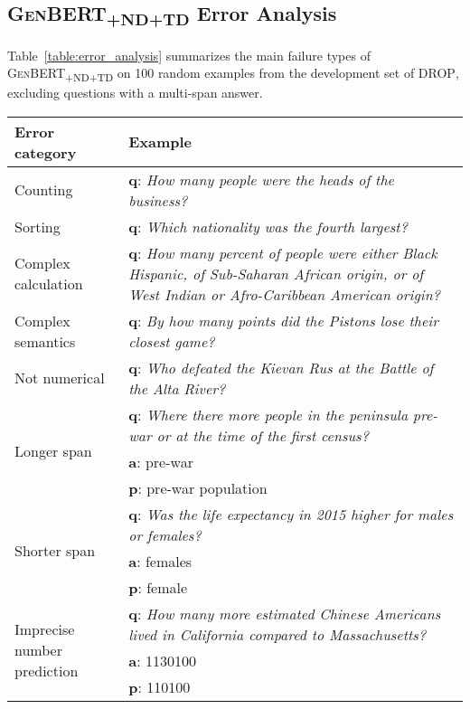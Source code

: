 \documentclass[11pt,a4paper]{article}
\newcommand\ssc[1]{\textsubscript{\textsc{#1}}}
\newcommand\drop{\textsc{DROP}}
\begin{document}
\subsection{\textsc{GenBERT\ssc{+ND+TD}} Error Analysis}\label{sec:error_analysis}

Table~\ref{table:error_analysis} summarizes the main failure types of \textsc{GenBERT}\ssc{+ND+TD} on 100 random examples from the development set of \drop{}, excluding questions with a multi-span answer.

\begin{table*}[t]
    \footnotesize
    \centering
    \begin{tabular}{p{3cm}|p{12cm}}
         Error category & Example \\
         \toprule
         Counting & \textbf{q}: \textit{How many people were the heads of the business?} \\
         Sorting & \textbf{q}: \textit{Which nationality was the fourth largest?} \\
         Complex calculation & \textbf{q}: \textit{How many percent of people were either Black Hispanic, of Sub-Saharan African origin, or of West Indian or Afro-Caribbean American origin?} \\
         Complex semantics & \textbf{q}: \textit{By how many points did the Pistons lose their closest game?} \\
         Not numerical & \textbf{q}: \textit{Who defeated the Kievan Rus at the Battle of the Alta River?} \\
         \hline \hline
         \multirow{3}{3cm}{Longer span} & \textbf{q}: \textit{Where there more people in the peninsula pre-war or at the time of the first census?} \\
         & \textbf{a}: pre-war \\
         & \textbf{p}: pre-war population \\
         \hline
         \multirow{3}{3cm}{Shorter span} & \textbf{q}: \textit{Was the life expectancy in 2015 higher for males or females?} \\
         & \textbf{a}: females \\
         & \textbf{p}: female \\
         \hline
         \multirow{3}{3cm}{Imprecise number prediction} & \textbf{q}: \textit{How many more estimated Chinese Americans lived in California compared to Massachusetts?} \\
         & \textbf{a}: 1130100 \\
         & \textbf{p}: 110100 \\
         \hline
    \end{tabular}
    \caption{Error categories of \textsc{GenBERT\ssc{+ND+TD}} on the development set of \drop{}, based on a manual error analysis of 85 random examples. The upper part shows categories which are not not covered by our pre-training tasks or do not require numerical skills. The lower part shows categories of inaccurate model predictions. The letters \textbf{q}, \textbf{a} and \textbf{p} denote the question, gold answer and model prediction, respectively.}
    \label{table:error_analysis}
\end{table*}

 
\end{document}
